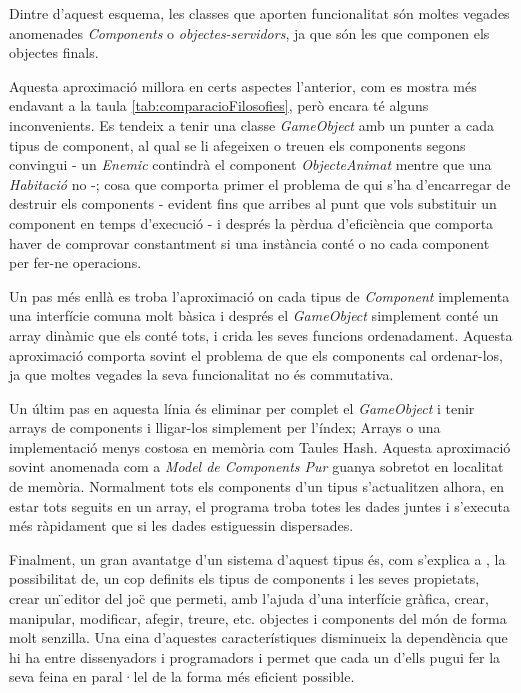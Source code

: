 Dintre d'aquest esquema, les classes que aporten funcionalitat són moltes vegades anomenades {\em Components} o {\em objectes-servidors}, ja que són les que componen els objectes finals.

Aquesta aproximació millora en certs aspectes l'anterior, com es mostra més endavant a la taula \ref{tab:comparacioFilosofies}, però encara té alguns inconvenients. Es tendeix a tenir una classe {\em GameObject} amb un punter a cada tipus de component, al qual se li afegeixen o treuen els components segons convingui - un {\em Enemic} contindrà el component {\em ObjecteAnimat} mentre que una {\em Habitació} no -; cosa que comporta primer el problema de qui s'ha d'encarregar de destruir els components - evident fins que arribes al punt que vols substituir un component en temps d'execució - i després la pèrdua d'eficiència que comporta haver de comprovar constantment si una instància conté o no cada component per fer-ne operacions.

Un pas més enllà es troba l'aproximació on cada tipus de {\em Component} implementa una interfície comuna molt bàsica i després el {\em GameObject} simplement conté un array dinàmic que els conté tots, i crida les seves funcions ordenadament. Aquesta aproximació comporta sovint el problema de que els components cal ordenar-los, ja que moltes vegades la seva funcionalitat no és commutativa.

Un últim pas en aquesta línia és eliminar per complet el {\em GameObject} i tenir arrays de components i lligar-los simplement per l'índex; Arrays o una implementació menys costosa en memòria com Taules Hash. Aquesta aproximació sovint anomenada com a {\em Model de Components Pur} \citep{Martin07} guanya sobretot en localitat de memòria. Normalment tots els components d'un tipus s'actualitzen alhora, en estar tots seguits en un array, el programa troba totes les dades juntes i s'executa més ràpidament que si les dades estiguessin dispersades.

Finalment, un gran avantatge d'un sistema d'aquest tipus és, com s'explica a \citep{Leonard99}, la possibilitat de, un cop definits els tipus de components i les seves propietats, crear un \"{}editor del joc\"{} que permeti, amb l'ajuda d'una interfície gràfica, crear, manipular, modificar, afegir, treure, etc. objectes i components del món de forma molt senzilla. Una eina d'aquestes característiques disminueix la dependència que hi ha entre dissenyadors i programadors i permet que cada un d'ells pugui fer la seva feina en paral·lel de la forma més eficient possible.

